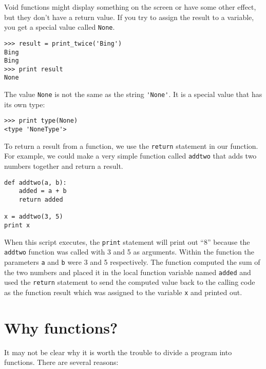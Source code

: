 Void functions might display something on the screen or have some
other effect, but they don't have a return value.  If you try to
assign the result to a variable, you get a special value called
{\tt None}.


\beforeverb
\begin{verbatim}
>>> result = print_twice('Bing')
Bing
Bing
>>> print result
None
\end{verbatim}
\afterverb
%
The value {\tt None} is not the same as the string \verb"'None'". 
It is a special value that has its own type:

\beforeverb
\begin{verbatim}
>>> print type(None)
<type 'NoneType'>
\end{verbatim}
\afterverb
%
To return a result from a function, we use the {\tt return} statement 
in our function.  For example, we could make a very 
simple function called {\tt addtwo}
that adds two numbers together and return a result.

\beforeverb
\begin{verbatim}
def addtwo(a, b):
    added = a + b
    return added

x = addtwo(3, 5)
print x
\end{verbatim}
\afterverb
%
When this script executes, the {\tt print} statement will print out ``8''
because the {\tt addtwo} function was called with 3 and 5 as arguments.
Within the function the parameters {\tt a} and {\tt b} were 3 and 5 
respectively. The function computed the sum of the two numbers and placed
it in the local function variable named {\tt added} 
and used the {\tt return} statement 
to send the computed value back to the calling code 
as the function result which was assigned
to the variable {\tt x} and printed out.


\section{Why functions?}

It may not be clear why it is worth the trouble to divide
a program into functions.  There are several reasons:

